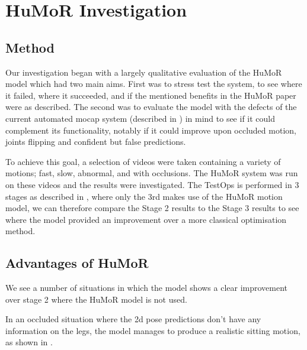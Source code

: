 \section{HuMoR Investigation}
\label{sec:humor_investigation}

\subsection{Method}
Our investigation began with a largely qualitative evaluation of the HuMoR model which had two main aims.  First was to stress test the system, to see where it failed, where it succeeded, and if the mentioned benefits in the HuMoR paper \cite{humor} were as described.  The second was to evaluate the model with the defects of the current automated mocap system (described in ) in mind to see if it could complement its functionality, notably if it could improve upon occluded motion, joints flipping and confident but false predictions.

To achieve this goal, a selection of videos were taken containing a variety of motions; fast, slow, abnormal, and with occlusions. The HuMoR system was run on these videos and the results were investigated. The TestOps is performed in 3 stages as described in , where only the 3rd makes use of the HuMoR motion model, we can therefore compare the Stage 2 results to the Stage 3 results to see where the model provided an improvement over a more classical optimisation method.

\subsection{Advantages of HuMoR}
We see a number of situations in which the model shows a clear improvement over stage 2 where the HuMoR model is not used.

In an occluded situation where the 2d pose predictions don't have any information on the legs, the model manages to produce a realistic sitting motion, as shown in .

